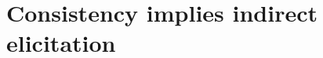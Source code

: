 \documentclass[11pt]{article} %
\begin{document}
%
%
%
%





\newpage
\appendix
\section{Consistency implies indirect elicitation}\label{sec:consis-implies-indir}
\end{document}
